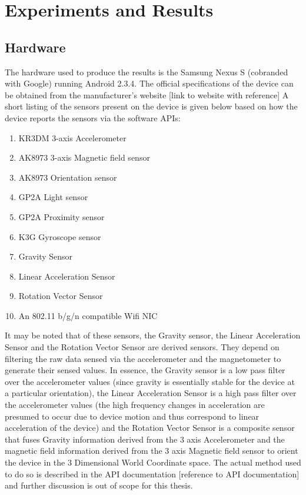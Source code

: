 \chapter{Experiments and Results\label{chap:results}}

\section{Hardware}
The hardware used to produce the results is the Samsung Nexus S (cobranded with
Google) running Android 2.3.4. The official specifications of the device can be
obtained from the manufacturer's website [link to website with reference] A
short listing of the sensors present on the device is given below based on how
the device reports the sensors via the software APIs:

\begin{enumerate}
\item KR3DM 3-axis Accelerometer
\item AK8973 3-axis Magnetic field sensor
\item AK8973 Orientation sensor
\item GP2A Light sensor
\item GP2A Proximity sensor
\item K3G Gyroscope sensor
\item Gravity Sensor
\item Linear Acceleration Sensor
\item Rotation Vector Sensor
\item An 802.11 b/g/n compatible Wifi NIC
\end{enumerate}

It may be noted that of these sensors, the Gravity sensor, the Linear
Acceleration Sensor and the Rotation Vector Sensor are derived sensors. They
depend on filtering the raw data sensed via the accelerometer and the
magnetometer to generate their sensed values. In essence, the Gravity sensor is
a low pass filter over the accelerometer values (since gravity is essentially
stable for the device at a particular orientation), the Linear Acceleration
Sensor is a high pass filter over the accelerometer values (the high frequency
changes in acceleration are presumed to occur due to device motion and thus
correspond to linear acceleration of the device) and the Rotation Vector Sensor
is a composite sensor that fuses Gravity information derived from the
3 axis Accelerometer and the magnetic field information derived from the
3 axis Magnetic field sensor to orient the device in the 3 Dimensional World 
Coordinate space. The actual method used to do so is described in the API
documentation [reference to API documentation] and
further discussion is out of scope for this thesis.

